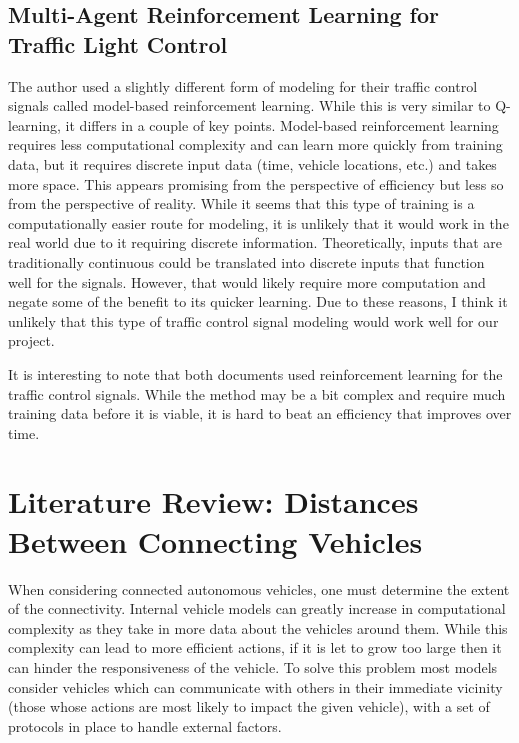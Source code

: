 \documentclass[10pt,letterpaper,draftclsnofoot,onecolumn]{IEEEtran}
\begin{document}
\subsection{Multi-Agent Reinforcement Learning for Traffic Light Control \cite{wiering2000multi}}
The author used a slightly different form of modeling for their traffic control signals called model-based reinforcement learning. While this is very similar to Q-learning, it differs in a couple of key points. Model-based reinforcement learning requires less computational complexity and can learn more quickly from training data, but it requires discrete input data (time, vehicle locations, etc.) and takes more space. This appears promising from the perspective of efficiency but less so from the perspective of reality. While it seems that this type of training is a computationally easier route for modeling, it is unlikely that it would work in the real world due to it requiring discrete information. Theoretically, inputs that are traditionally continuous could be translated into discrete inputs that function well for the signals. However, that would likely require more computation and negate some of the benefit to its quicker learning. Due to these reasons, I think it unlikely that this type of traffic control signal modeling would work well for our project.

It is interesting to note that both documents used reinforcement learning for the traffic control signals. While the method may be a bit complex and require much training data before it is viable, it is hard to beat an efficiency that improves over time.
\section{Literature Review: Distances Between Connecting Vehicles}
When considering connected autonomous vehicles, one must determine the extent of the connectivity. Internal vehicle models can greatly increase in computational complexity as they take in more data about the vehicles around them. While this complexity can lead to more efficient actions, if it is let to grow too large then it can hinder the responsiveness of the vehicle. To solve this problem most models consider vehicles which can communicate with others in their immediate vicinity (those whose actions are most likely to impact the given vehicle), with a set of protocols in place to handle external factors.
\end{document}
